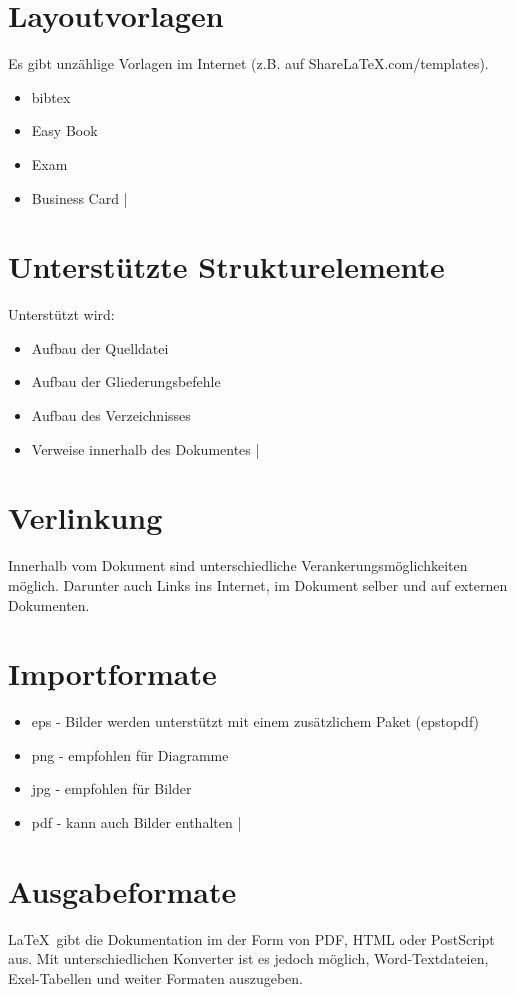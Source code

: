 \documentclass{article}
\begin{document}
\section{Layoutvorlagen}
Es gibt unzählige Vorlagen im Internet (z.B. auf ShareLaTeX.com/templates).
\begin{itemize}
	\item bibtex
	\item Easy Book
	\item Exam
	\item Business Card
|\end{itemize}

\section{Unterstützte Strukturelemente}
Unterstützt wird:
\begin{itemize}
	\item Aufbau der Quelldatei
	\item Aufbau der Gliederungsbefehle
	\item Aufbau des Verzeichnisses
	\item Verweise innerhalb des Dokumentes
|\end{itemize}

\section{Verlinkung}
Innerhalb vom Dokument sind unterschiedliche Verankerungsmöglichkeiten möglich. Darunter auch Links ins Internet, im Dokument selber und auf externen Dokumenten.

\section{Importformate}
\begin{itemize}
	\item eps - Bilder werden unterstützt mit einem zusätzlichem Paket (epstopdf)
	\item png - empfohlen für Diagramme
	\item jpg - empfohlen für Bilder
	\item pdf - kann auch Bilder enthalten
|\end{itemize}

\section{Ausgabeformate}
\LaTeX\ gibt die Dokumentation im der Form von PDF, HTML oder PostScript aus. Mit unterschiedlichen Konverter ist es jedoch möglich, Word-Textdateien, Exel-Tabellen und weiter Formaten auszugeben.
\end{document}
